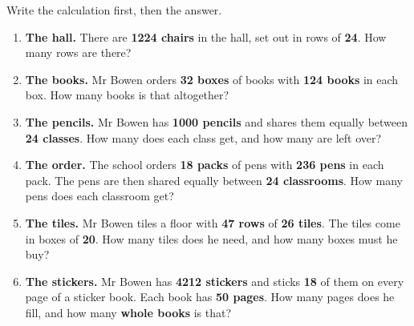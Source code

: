 \documentclass[12pt,a4paper]{article}
\begin{document}
\noindent Write the calculation first, then the answer.

\begin{enumerate}[label=\textbf{\arabic*.}, itemsep=11pt]

  \item \textbf{The hall.} There are \textbf{1224 chairs} in the hall, set out in
        rows of \textbf{24}. How many rows are there?
        \begin{workspace}[3.0cm]\end{workspace}

  \item \textbf{The books.} Mr Bowen orders \textbf{32 boxes} of books with
        \textbf{124 books} in each box. How many books is that altogether?
        \begin{workspace}[3.0cm]\end{workspace}

  \item \textbf{The pencils.} Mr Bowen has \textbf{1000 pencils} and shares them
        equally between \textbf{24 classes}. How many does each class get, and how
        many are left over?
        \begin{workspace}[3.2cm]\end{workspace}

  \item \textbf{The order.} The school orders \textbf{18 packs} of pens with
        \textbf{236 pens} in each pack. The pens are then shared equally between
        \textbf{24 classrooms}. How many pens does each classroom get?
        \begin{workspace}[3.6cm]\end{workspace}

  \item \textbf{The tiles.} Mr Bowen tiles a floor with \textbf{47 rows} of
        \textbf{26 tiles}. The tiles come in boxes of \textbf{20}. How many tiles
        does he need, and how many boxes must he buy?
        \begin{workspace}[3.6cm]\end{workspace}

  \item \textbf{The stickers.} Mr Bowen has \textbf{4212 stickers} and sticks
        \textbf{18} of them on every page of a sticker book. Each book has
        \textbf{50 pages}. How many pages does he fill, and how many \textbf{whole
        books} is that?
        \begin{workspace}[4.4cm]\end{workspace}

\end{enumerate}
\end{document}

